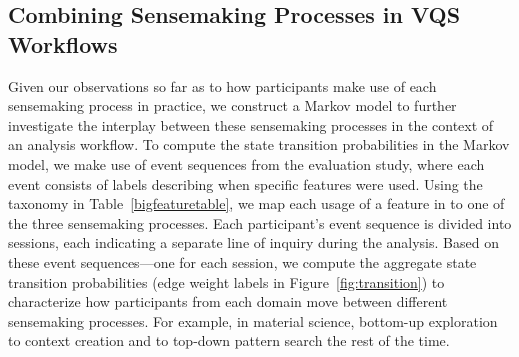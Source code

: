  \subsection{Combining Sensemaking Processes in VQS Workflows}
 Given our observations so far as to how participants make use of each sensemaking process in practice, we construct a Markov model to further investigate the interplay between these sensemaking processes in the context of an analysis workflow. %
 To compute the state transition probabilities in the Markov model, we make use of event sequences from the evaluation study, where each event consists of labels describing when specific features were used.
 Using the taxonomy in Table~\ref{bigfeaturetable}, we map each usage of a feature in \zvpp to one of the three sensemaking processes. Each participant's event sequence is divided into sessions, each indicating a separate line of inquiry during the analysis. Based on these event sequences---one for each session,
 we compute the aggregate state transition probabilities (edge weight labels in Figure~\ref{fig:transition}) to characterize how participants from each domain move between different sensemaking processes. For example, in material science, bottom-up exploration  to context creation and to top-down pattern search the rest of the time.
